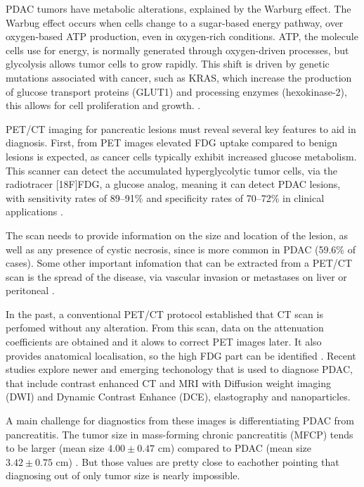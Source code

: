 PDAC tumors have metabolic alterations, explained by the Warburg effect.\cite{Hammond2024} The Warbug effect occurs when cells change to a sugar-based energy pathway, over oxygen-based ATP production, even in oxygen-rich conditions. ATP, the molecule cells use for energy, is normally generated through oxygen-driven processes, but glycolysis allows tumor cells to grow rapidly. This shift is driven by genetic mutations associated with cancer, such as KRAS, which increase the production of glucose transport proteins (GLUT1) and processing enzymes (hexokinase-2), this allows for cell proliferation and growth. \cite{Pubmed30721664, Pu2021}.


PET/CT imaging for pancreatic lesions must reveal several key features to aid in diagnosis. First, from PET images elevated FDG uptake compared to benign lesions is expected, as cancer cells typically exhibit increased glucose metabolism. This scanner can detect the accumulated hyperglycolytic tumor cells, via the radiotracer [18F]FDG, a glucose analog, meaning it can detect PDAC lesions, with sensitivity rates of 89–91\% and specificity rates of 70–72\% in clinical applications \cite{Pu2021}.

The scan needs to provide information on the size and location of the lesion, as well as any presence of cystic necrosis, since is more common in PDAC (59.6\% of cases). Some other important infomation that can be extracted from a PET/CT scan is the spread of the disease, via vascular invasion or metastases on liver or peritoneal \cite{parikh2020fdg}.  

In the past, a conventional PET/CT protocol established that CT scan is perfomed without any alteration. From this scan, data on the attenuation coefficients are obtained and it alows to correct PET images later. It also provides anatomical localisation, so the high FDG part can be identified \cite{benamor2007petct}. Recent studies explore newer and emerging techonology that is used to diagnose PDAC, that include contrast enhanced CT and MRI with Diffusion weight imaging (DWI) and Dynamic Contrast Enhance (DCE), elastography and nanoparticles. \cite{Cancers2023}


A main challenge for diagnostics from these images is differentiating PDAC from pancreatitis. The tumor size in mass-forming chronic pancreatitis (MFCP) tends to be larger (mean size $4.00 \pm 0.47$ cm) compared to PDAC (mean size $3.42 \pm 0.75$ cm) \cite{arnone2020}. But those values are pretty close to eachother pointing that diagnosing out of only tumor size is nearly impossible. 

